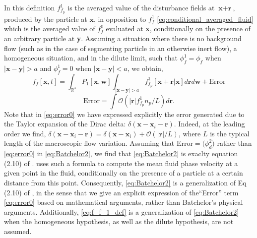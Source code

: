 In this definition $f_{f_p}^1$ is the averaged value of the disturbance fields at $\textbf{x}+\textbf{r}$, produced by the particle at $\textbf{x}$, in opposition to $f_f^1$ \eqref{eq:conditional_averaged_fluid} which is the averaged value of $f_f^0$ evaluated at \textbf{x}, conditionally on the presence of an arbitrary particle at \textbf{y}.
Assuming a situation where there is no background flow (such as in the case of segmenting particle in an otherwise inert flow), a homogeneous situation, and in the dilute limit, such that $\phi_f^1 = \phi_f$ when $|\textbf{x}-\textbf{y}|>a$ and $\phi_f^1 =0$ when $|\textbf{x}-\textbf{y}|<a$, we obtain, 
\begin{equation}
    f_f[\textbf{x},t]
    = 
    \int_{\mathbb{R}^3} 
    P_1[\textbf{x},\textbf{w}] 
    \int_{|\textbf{x}-\textbf{y}| >a} 
    f_{f_p}^1[\textbf{x}+ \textbf{r}| \textbf{x}]
    d\textbf{r}
    d\textbf{w}
    + 
    \text{Error}
    \label{eq:Batchelor2}
\end{equation}
\begin{equation}
    \text{Error}
    = 
    \int{
    \mathcal{O}(|\textbf{r}| f_{f_p}^1  n_p / L)
    } d\textbf{r}. 
    \label{eq:error0}
\end{equation}
Note that in \ref{eq:error0} we have expressed explicitly the error generated due to the Taylor expansion of the Dirac delta: $\delta(\textbf{x} - \textbf{x}_i - \textbf{r})$. 
Indeed, at the leading order we find, $\delta(\textbf{x} - \textbf{x}_i - \textbf{r}) =\delta(\textbf{x} - \textbf{x}_i) +  \mathcal{O}(|\textbf{r}|/L)$, where $L$ is the typical length of the macroscopic flow variation.
Assuming that $\text{Error}= \mathcal(\phi_d^2)$ rather than \ref{eq:error0} in \ref{eq:Batchelor2}, we find that \ref{eq:Batchelor2} is exaclty equation (2.10) of \citet{batchelor1972sedimentation}. 
\citet{batchelor1972sedimentation} uses such a formula to compute the mean fluid phase velocity at a given point in the fluid, conditionally on the presence of a particle at a certain distance from this point. 
Consequently, \ref{eq:Batchelor2} is a generalization of Eq (2.10) of \citet{batchelor1972sedimentation}, in the sense that we give an explicit expression of the``Error'' term \eqref{eq:error0} based on mathematical arguments, rather than Batchelor's physical arguments. 
Additionally, \ref{eq:f_f_1_def} is a generalization of \ref{eq:Batchelor2} when the homogeneous hypothesis, as well as the dilute hypothesis, are not assumed. 



